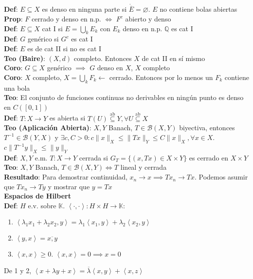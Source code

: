 \documentclass[9pt]{extarticle}
\newcommand{\K}{\mathbb{K}}
\newcommand{\Q}{\mathbb{Q}}
\newcommand{\inn}[1]{\left\langle #1\right\rangle}
\begin{document}
\begin{multicols*}{2}
\textbf{Def}: $E\subseteq X$ es denso en ninguna parte si $\mathring{\overline{E}}=\varnothing$. $E$ no contiene bolas abiertas\\
\textbf{Prop}: $F$ cerrado y denso en n.p. $\iff$ $F^c$ abierto y denso\\
\textbf{Def}: $E\subseteq X$ cat I si $E=\bigcup_k E_k$ con $E_k$ denso en n.p. $\Q$ es cat I\\
\textbf{Def}: $G$ genérico si $G^c$ es cat I\\
\textbf{Def}: $E$ es de cat II si no es cat I\\
\textbf{Teo (Baire)}: $(X,d)$ completo. Entonces $X$ de cat II en sí mismo\\
\textbf{Coro}: $G\subseteq X$ genérico $\implies$ $G$ denso en $X$, $X$ completo\\
\textbf{Coro}: $X$ completo, $X=\bigcup_k F_k\leftarrow$ cerrado. Entonces por lo menos un $F_k$ contiene una bola\\
\textbf{Teo}: El conjunto de funciones continuas no derivables en ningún punto es denso en $C([0,1])$\\
\textbf{Def}: $T:X\to Y$ es abierta si $T(U)\overset{\text{ab}}{\subseteq}Y,\forall U\overset{\text{ab}}{\subseteq} X$\\
\textbf{Teo (Aplicación Abierta)}: $X,Y$ Banach, $T\in \mathcal{B}(X,Y)$ biyectiva, entonces $T^{-1}\in \mathcal{B}(Y,X)$ y $\exists c,C>0:c\|x\|_X\leq \|Tx\|_Y\leq C\|x\|_X,\forall x\in X$. $c\|T^{-1}y\|_X\leq \|y\|_Y$\\
\textbf{Def}: $X,Y$ e.m. $T:X\to Y$ cerrada si $G_T=\{(x,Tx)\in X\times Y\}$ es cerrado en $X\times Y$\\
\textbf{Teo}: $X,Y$ Banach, $T\in\mathcal{B}(X,Y)\iff T$ lineal y cerrada\\
\textbf{Resultado}: Para demostrar continuidad, $x_n\to x\implies Tx_n\to Tx$. Podemos asumir que $Tx_n\to Ty$ y mostrar que $y=Tx$\\
\large\textbf{Espacios de Hilbert}\\\normalsize
\textbf{Def}: $H$ e.v. sobre $\K$. $\inn{\cdot,\cdot}:H\times H\to \K$:
\begin{enumerate}
	\item $\inn{\lambda_1x_1+\lambda_2x_2,y}=\lambda_1\inn{x_1,y}+\lambda_2\inn{x_2,y}$
	\item $\inn{y,x}=\overline{x,y}$
	\item $\inn{x,x}\geq 0$. $\inn{x,x}=0\implies x=0$
\end{enumerate}
De 1 y 2, $\inn{x+\lambda y+x}=\overline{\lambda}\inn{x,y}+\inn{x,z}$\\

\end{multicols*}
\end{document}
